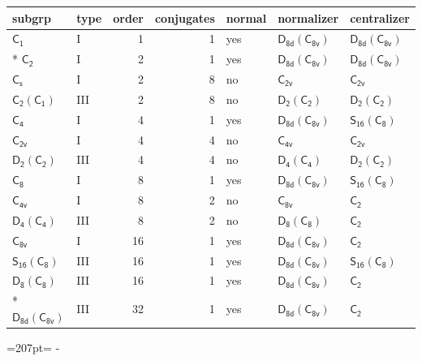 \documentclass[10pt,a4paper]{article}
\newcommand{\needspace}[1]{\par\penalty-100\begingroup\dimen0=#1\relax\dimen2=\pagegoal
  \advance\dimen2-\pagetotal\ifdim\dimen0>\dimen2\relax\ifdim\dimen2>0pt\vfil\break\fi\fi
  \endgroup}
\numberwithin{equation}{section}
\newcommand{\grp}[1]{\mathsf{#1}}
\begin{document}
{\small\begin{longtable}{@{}llrrlll@{}}\toprule
subgrp & type & order & conjugates & normal & normalizer & centralizer\\\midrule\endhead
\bottomrule\endfoot\endlastfoot
\href{../../../rotation/data/pdf/C1.pdf}{$\grp{C_{1}}$} & I & 1 & 1 & yes & \href{D8d-C8v.pdf}{$\grp{D_{8d}}(\grp{C_{8v}})$} & \href{D8d-C8v.pdf}{$\grp{D_{8d}}(\grp{C_{8v}})$}\\*
\href{../../../rotation/data/pdf/C2.pdf}{$\grp{C_{2}}$} & I & 2 & 1 & yes & \href{D8d-C8v.pdf}{$\grp{D_{8d}}(\grp{C_{8v}})$} & \href{D8d-C8v.pdf}{$\grp{D_{8d}}(\grp{C_{8v}})$}\\
\href{../../../rotation/data/pdf/C1v.pdf}{$\grp{C_{s}}$} & I & 2 & 8 & no & \href{../../../rotation/data/pdf/C2v.pdf}{$\grp{C_{2v}}$} & \href{../../../rotation/data/pdf/C2v.pdf}{$\grp{C_{2v}}$}\\
\href{C2-C1.pdf}{$\grp{C_{2}}(\grp{C_{1}})$} & III & 2 & 8 & no & \href{D2-C2.pdf}{$\grp{D_{2}}(\grp{C_{2}})$} & \href{D2-C2.pdf}{$\grp{D_{2}}(\grp{C_{2}})$}\\
\href{../../../rotation/data/pdf/C4.pdf}{$\grp{C_{4}}$} & I & 4 & 1 & yes & \href{D8d-C8v.pdf}{$\grp{D_{8d}}(\grp{C_{8v}})$} & \href{S16-C8.pdf}{$\grp{S_{16}}(\grp{C_{8}})$}\\
\href{../../../rotation/data/pdf/C2v.pdf}{$\grp{C_{2v}}$} & I & 4 & 4 & no & \href{../../../rotation/data/pdf/C4v.pdf}{$\grp{C_{4v}}$} & \href{../../../rotation/data/pdf/C2v.pdf}{$\grp{C_{2v}}$}\\
\href{D2-C2.pdf}{$\grp{D_{2}}(\grp{C_{2}})$} & III & 4 & 4 & no & \href{D4-C4.pdf}{$\grp{D_{4}}(\grp{C_{4}})$} & \href{D2-C2.pdf}{$\grp{D_{2}}(\grp{C_{2}})$}\\
\href{../../../rotation/data/pdf/C8.pdf}{$\grp{C_{8}}$} & I & 8 & 1 & yes & \href{D8d-C8v.pdf}{$\grp{D_{8d}}(\grp{C_{8v}})$} & \href{S16-C8.pdf}{$\grp{S_{16}}(\grp{C_{8}})$}\\
\href{../../../rotation/data/pdf/C4v.pdf}{$\grp{C_{4v}}$} & I & 8 & 2 & no & \href{../../../rotation/data/pdf/C8v.pdf}{$\grp{C_{8v}}$} & \href{../../../rotation/data/pdf/C2.pdf}{$\grp{C_{2}}$}\\
\href{D4-C4.pdf}{$\grp{D_{4}}(\grp{C_{4}})$} & III & 8 & 2 & no & \href{D8-C8.pdf}{$\grp{D_{8}}(\grp{C_{8}})$} & \href{../../../rotation/data/pdf/C2.pdf}{$\grp{C_{2}}$}\\
\href{../../../rotation/data/pdf/C8v.pdf}{$\grp{C_{8v}}$} & I & 16 & 1 & yes & \href{D8d-C8v.pdf}{$\grp{D_{8d}}(\grp{C_{8v}})$} & \href{../../../rotation/data/pdf/C2.pdf}{$\grp{C_{2}}$}\\
\href{S16-C8.pdf}{$\grp{S_{16}}(\grp{C_{8}})$} & III & 16 & 1 & yes & \href{D8d-C8v.pdf}{$\grp{D_{8d}}(\grp{C_{8v}})$} & \href{S16-C8.pdf}{$\grp{S_{16}}(\grp{C_{8}})$}\\
\href{D8-C8.pdf}{$\grp{D_{8}}(\grp{C_{8}})$} & III & 16 & 1 & yes & \href{D8d-C8v.pdf}{$\grp{D_{8d}}(\grp{C_{8v}})$} & \href{../../../rotation/data/pdf/C2.pdf}{$\grp{C_{2}}$}\\*
\href{D8d-C8v.pdf}{$\grp{D_{8d}}(\grp{C_{8v}})$} & III & 32 & 1 & yes & \href{D8d-C8v.pdf}{$\grp{D_{8d}}(\grp{C_{8v}})$} & \href{../../../rotation/data/pdf/C2.pdf}{$\grp{C_{2}}$}\\
\bottomrule\end{longtable}}
\needspace{207pt}
\end{document}

